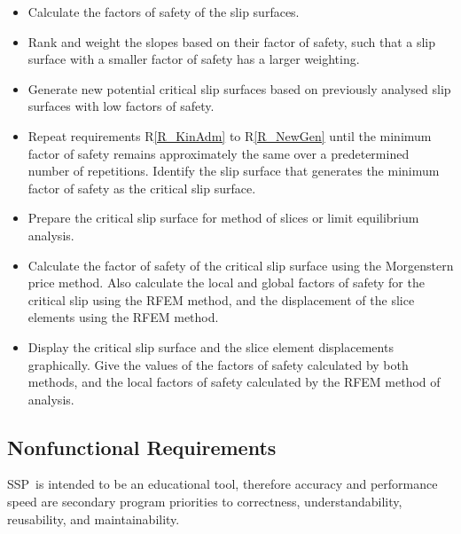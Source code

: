 \documentclass[12pt]{article}
\newcommand{\progname}{SSP}
\newcounter{reqnum} %
\newcommand{\rref}[1]{R\ref{#1}}
\begin{document}
\begin{itemize}
\item[R\refstepcounter{reqnum}\thereqnum \label{R_FS}:] Calculate the
  factors of safety of the slip surfaces.

\item[R\refstepcounter{reqnum}\thereqnum \label{R_Weight}:] Rank and
  weight the slopes based on their factor of safety, such that a slip
  surface with a smaller factor of safety has a larger weighting.

\item[R\refstepcounter{reqnum}\thereqnum \label{R_NewGen}:] Generate
  new potential critical slip surfaces based on previously analysed
  slip surfaces with low factors of safety.

\item[R\refstepcounter{reqnum}\thereqnum \label{R_Minimize}:] Repeat
  requirements \rref{R_KinAdm} to \rref{R_NewGen} until the
  minimum factor of safety remains approximately the same over a
  predetermined number of repetitions. Identify the slip surface that
  generates the minimum factor of safety as the critical slip surface.

\item[R\refstepcounter{reqnum}\thereqnum \label{R_PrepOutput}:]
  Prepare the critical slip surface for method of slices or limit
  equilibrium analysis.

\item[R\refstepcounter{reqnum}\thereqnum \label{R_Analyze}:] Calculate
  the factor of safety of the critical slip surface using the
  Morgenstern price method. Also calculate the local and global
  factors of safety for the critical slip using the RFEM method, and
  the displacement of the slice elements using the RFEM method.

\item[R\refstepcounter{reqnum}\thereqnum \label{R_Output}:] Display
  the critical slip surface and the slice element displacements
  graphically. Give the values of the factors of safety calculated by
  both methods, and the local factors of safety calculated by the RFEM
  method of analysis.
  
\end{itemize}


\subsection{Nonfunctional Requirements}

\progname\ is intended to be an educational tool, therefore accuracy and
performance speed are secondary program priorities to correctness,
understandability, reusability, and maintainability.
\end{document}
